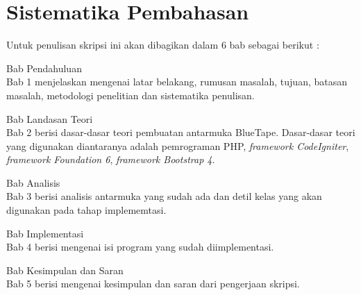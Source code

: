\section{Sistematika Pembahasan}
\label{sec:sispem}
Untuk penulisan skripsi ini akan dibagikan dalam 6 bab sebagai berikut :
\doublespacing
\begin{singlespace}
\noindent Bab Pendahuluan \\
Bab 1 menjelaskan mengenai latar belakang, rumusan masalah, tujuan, batasan masalah, metodologi penelitian dan sistematika penulisan.
\end{singlespace}

\begin{singlespace}
\noindent Bab Landasan Teori \\
Bab 2 berisi dasar-dasar teori pembuatan antarmuka BlueTape. Dasar-dasar teori yang digunakan diantaranya adalah pemrograman PHP, \textit{framework CodeIgniter}, \textit{framework Foundation 6}, \textit{framework Bootstrap 4}.
\end{singlespace}

\begin{singlespace}
\noindent Bab Analisis \\
Bab 3 berisi analisis antarmuka yang sudah ada dan detil kelas yang akan digunakan pada tahap implememtasi.
\end{singlespace}

\begin{singlespace}
\noindent Bab Implementasi \\
Bab 4 berisi mengenai isi program yang sudah diimplementasi.
\end{singlespace}

\begin{singlespace}
\noindent Bab Kesimpulan dan Saran \\
Bab 5 berisi mengenai kesimpulan dan saran dari pengerjaan skripsi.
\end{singlespace}
